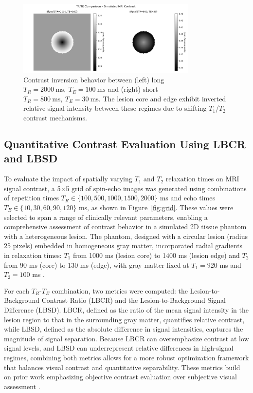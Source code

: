 \documentclass[10pt,a4paper,twoside]{article}
\begin{document}
\begin{figure}[htbp!]
\centering
\includegraphics[width=0.8\textwidth]{trtecomparisonforcontrast.png}
\caption{Contrast inversion behavior between (left) long \( T_R = 2000 \ \mathrm{ms},\ T_E = 100 \ \mathrm{ms} \) and (right) short \( T_R = 800 \ \mathrm{ms},\ T_E = 30 \ \mathrm{ms} \). The lesion core and edge exhibit inverted relative signal intensity between these regimes due to shifting $T_1$/$T_2$ contrast mechanisms.}
\label{fig:inversion}
\end{figure}

\subsection{Quantitative Contrast Evaluation Using LBCR and LBSD}

To evaluate the impact of spatially varying \( T_1 \) and \( T_2 \) relaxation times on MRI signal contrast, a 5×5 grid of spin-echo images was generated using combinations of repetition times \( T_R \in \{100, 500, 1000, 1500, 2000\} \) ms and echo times \( T_E \in \{10, 30, 60, 90, 120\} \) ms, as shown in Figure~\ref{fig:grid}. These values were selected to span a range of clinically relevant parameters, enabling a comprehensive assessment of contrast behavior in a simulated 2D tissue phantom with a heterogeneous lesion. The phantom, designed with a circular lesion (radius 25 pixels) embedded in homogeneous gray matter, incorporated radial gradients in relaxation times: \( T_1 \) from 1000 ms (lesion core) to 1400 ms (lesion edge) and \( T_2 \) from 90 ms (core) to 130 ms (edge), with gray matter fixed at \( T_1 = 920 \) ms and \( T_2 = 100 \) ms \cite{stanisz2005, bojorquez2017}.

For each \( T_R \)-\( T_E \) combination, two metrics were computed: the Lesion-to-Background Contrast Ratio (LBCR) and the Lesion-to-Background Signal Difference (LBSD). LBCR, defined as the ratio of the mean signal intensity in the lesion region to that in the surrounding gray matter, quantifies relative contrast, while LBSD, defined as the absolute difference in signal intensities, captures the magnitude of signal separation. Because LBCR can overemphasize contrast at low signal levels, and LBSD can underrepresent relative differences in high-signal regimes, combining both metrics allows for a more robust optimization framework that balances visual contrast and quantitative separability. These metrics build on prior work emphasizing objective contrast evaluation over subjective visual assessment \cite{dewilde1997, mustafa2021}.
\end{document}
